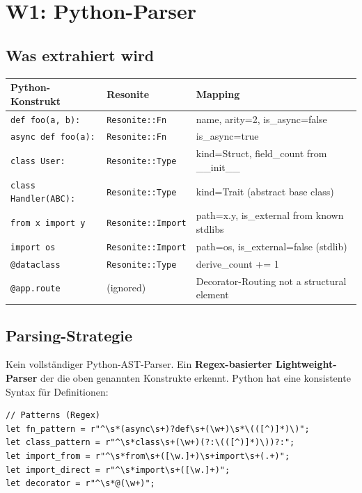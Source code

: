 \documentclass[11pt,a4paper]{article}
\begin{document}
\section{W1: Python-Parser}
\label{sec:python}

\subsection{Was extrahiert wird}

\begin{longtable}{lp{4cm}p{5cm}}
\toprule
\textbf{Python-Konstrukt} & \textbf{Resonite} & \textbf{Mapping} \\
\midrule
\texttt{def foo(a, b):}
  & \texttt{Resonite::Fn}
  & name, arity=2, is\_async=false \\
\texttt{async def foo(a):}
  & \texttt{Resonite::Fn}
  & is\_async=true \\
\texttt{class User:}
  & \texttt{Resonite::Type}
  & kind=Struct, field\_count from \_\_init\_\_ \\
\texttt{class Handler(ABC):}
  & \texttt{Resonite::Type}
  & kind=Trait (abstract base class) \\
\texttt{from x import y}
  & \texttt{Resonite::Import}
  & path=x.y, is\_external from known stdlibs \\
\texttt{import os}
  & \texttt{Resonite::Import}
  & path=os, is\_external=false (stdlib) \\
\texttt{@dataclass}
  & \texttt{Resonite::Type}
  & derive\_count += 1 \\
\texttt{@app.route}
  & (ignored)
  & Decorator-Routing not a structural element \\
\bottomrule
\end{longtable}

\subsection{Parsing-Strategie}

Kein vollst\"andiger Python-AST-Parser. Ein \textbf{Regex-basierter 
Lightweight-Parser} der die oben genannten Konstrukte 
erkennt. Python hat eine konsistente Syntax f\"ur Definitionen:

\begin{lstlisting}[style=rust]
// Patterns (Regex)
let fn_pattern = r"^\s*(async\s+)?def\s+(\w+)\s*\(([^)]*)\)";
let class_pattern = r"^\s*class\s+(\w+)(?:\(([^)]*)\))?:";
let import_from = r"^\s*from\s+([\w.]+)\s+import\s+(.+)";
let import_direct = r"^\s*import\s+([\w.]+)";
let decorator = r"^\s*@(\w+)";
\end{lstlisting}
\end{document}
